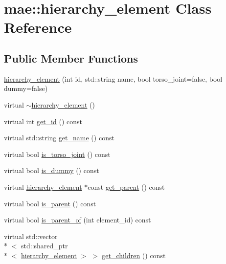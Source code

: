 \hypertarget{classmae_1_1hierarchy__element}{\section{mae\-:\-:hierarchy\-\_\-element Class Reference}
\label{classmae_1_1hierarchy__element}
}
\subsection*{Public Member Functions}
\begin{DoxyCompactItemize}
\item 
\hyperlink{classmae_1_1hierarchy__element_a894ee08fc56586037507fd7d9b4aee9b}{hierarchy\-\_\-element} (int id, std\-::string name, bool torso\-\_\-joint=false, bool dummy=false)
\item 
virtual \hyperlink{classmae_1_1hierarchy__element_a9c228a1b66c7aeda32b6426fc37f6da2}{$\sim$hierarchy\-\_\-element} ()
\item 
virtual int \hyperlink{classmae_1_1hierarchy__element_a1f9e4c35e3b0bcb1d1da8be8c65a2dbf}{get\-\_\-id} () const 
\item 
virtual std\-::string \hyperlink{classmae_1_1hierarchy__element_a7659c533f9a15877e9b8caac9d4b7da0}{get\-\_\-name} () const 
\item 
virtual bool \hyperlink{classmae_1_1hierarchy__element_aa513812e063c91d1f8ae8f8d3e17a77c}{is\-\_\-torso\-\_\-joint} () const 
\item 
virtual bool \hyperlink{classmae_1_1hierarchy__element_a820978a67006a4c91e7ffa088d193d34}{is\-\_\-dummy} () const 
\item 
virtual \hyperlink{classmae_1_1hierarchy__element}{hierarchy\-\_\-element} $\ast$const \hyperlink{classmae_1_1hierarchy__element_a70dc79139b05242d44391a9f76c3e2db}{get\-\_\-parent} () const 
\item 
virtual bool \hyperlink{classmae_1_1hierarchy__element_aa787da98d8ad16c9432ee87c4ac1f804}{is\-\_\-parent} () const 
\item 
virtual bool \hyperlink{classmae_1_1hierarchy__element_aa650af474bec0a01e6e7ea680fc77bcb}{is\-\_\-parent\-\_\-of} (int element\-\_\-id) const 
\item 
virtual std\-::vector\\*
$<$ std\-::shared\-\_\-ptr\\*
$<$ \hyperlink{classmae_1_1hierarchy__element}{hierarchy\-\_\-element} $>$ $>$ \hyperlink{classmae_1_1hierarchy__element_a877c9a70e5eeaec02cdd74a8aff828de}{get\-\_\-children} () const 

\end{DoxyCompactItemize}
